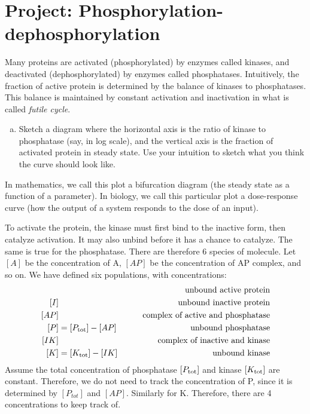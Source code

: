 \documentclass{exam}
\begin{document}
\section*{Project: Phosphorylation-dephosphorylation}
 
Many proteins are activated (phosphorylated) by enzymes called kinases, and deactivated (dephosphorylated) by enzymes called phosphatases. Intuitively, the fraction of active protein is determined by the balance of kinases to phosphatases. This balance is maintained by constant activation and inactivation in what is called \textit{futile cycle}.

\begin{enumerate}[a.]
\item Sketch a diagram where the horizontal axis is the ratio of kinase to phosphatase (say, in log scale), and the vertical axis is the fraction of activated protein in steady state. Use your intuition to sketch what you think the curve should look like.
\end{enumerate}
\vspace{2em}

In mathematics, we call this plot a bifurcation diagram (the steady state as a function of a parameter). In biology, we call this particular plot a dose-response curve (how the output of a system responds to the dose of an input). 

To activate the protein, the kinase must first bind to the inactive form, then catalyze activation. It may also unbind before it has a chance to catalyze. The same is true for the phosphatase. There are therefore 6 species of molecule.
Let $[A]$ be the concentration of A, $[AP]$ be the concentration of AP complex, and so on. We have defined six populations, with concentrations:
\begin{align*}
[A]&&\qquad \mbox{unbound active protein}\\
[I]&&\qquad \mbox{unbound inactive protein}\\
[AP]&&\qquad \mbox{complex of active and phosphatase}\\
[P] &= [P_{\rm tot}] - [AP] &\qquad \mbox{unbound phosphatase}\\
[IK]& &\qquad \mbox{complex of inactive and kinase}\\
[K] &= [K_{\rm tot}] - [IK] &\qquad \mbox{unbound kinase}
\end{align*}
Assume the total concentration of phosphatase $[P_{\rm tot}]$ and kinase $[K_{\rm tot}]$ are constant. Therefore, we do not need to track the concentration of P, since it is determined by $[P_{tot}]$ and $[AP]$. Similarly for K. Therefore, there are 4 concentrations to keep track of.
\end{document}
